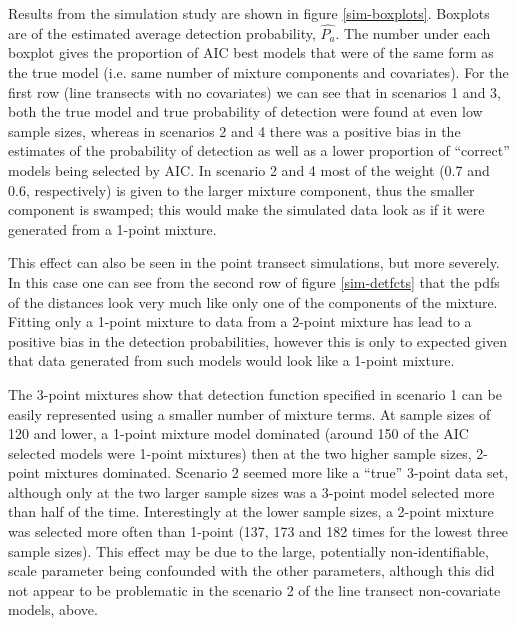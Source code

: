 \documentclass[useAMS,referee, usegraphicx]{biom}
\begin{document}
Results from the simulation study are shown in figure \ref{sim-boxplots}. Boxplots are of the estimated average detection probability, $\hat{P_a}$. The number under each boxplot gives the proportion of AIC best models that were of the same form as the true model (i.e. same number of mixture components and covariates). For the first row (line transects with no covariates) we can see that in scenarios 1 and 3, both the true model and true probability of detection were found at even low sample sizes, whereas in scenarios 2 and 4 there was a positive bias in the estimates of the probability of detection as well as a lower proportion of ``correct'' models being selected by AIC. In scenario 2 and 4 most of the weight (0.7 and 0.6, respectively) is given to the larger mixture component, thus the smaller component is swamped; this would make the simulated data look as if it were generated from a 1-point mixture.

This effect can also be seen in the point transect simulations, but more severely. In this case one can see from the second row of figure \ref{sim-detfcts} that the pdfs of the distances look very much like only one of the components of the mixture. Fitting only a 1-point mixture to data from a 2-point mixture has lead to a positive bias in the detection probabilities, however this is only to expected given that data generated from such models would look like a 1-point mixture.

The 3-point mixtures show that detection function specified in scenario 1 can be easily represented using a smaller number of mixture terms. At sample sizes of 120 and lower, a 1-point mixture model dominated (around 150 of the AIC selected models were 1-point mixtures) then at the two higher sample sizes, 2-point mixtures dominated. Scenario 2 seemed more like a ``true'' 3-point data set, although only at the two larger sample sizes was a 3-point model selected more than half of the time. Interestingly at the lower sample sizes, a 2-point mixture was selected more often than 1-point (137, 173 and 182 times for the lowest three sample sizes). This effect may be due to the large, potentially non-identifiable, scale parameter being confounded with the other parameters, although this did not appear to be problematic in the scenario 2 of the line transect non-covariate models, above.
\end{document}
